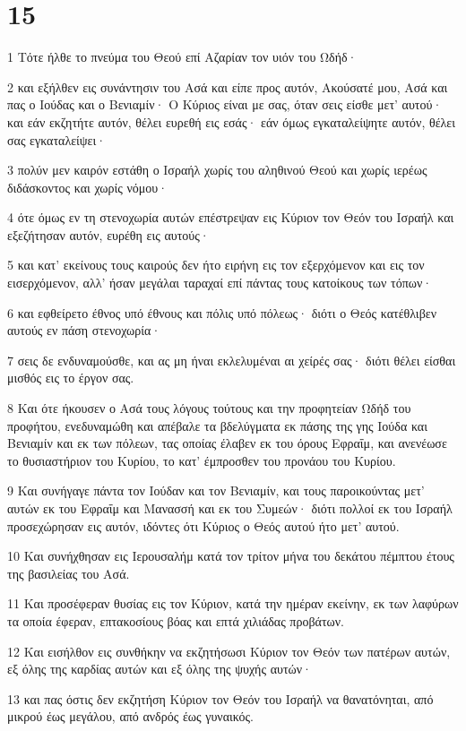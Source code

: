 \chapter{15}

\par 1 Τότε ήλθε το πνεύμα του Θεού επί Αζαρίαν τον υιόν του Ωδήδ·
\par 2 και εξήλθεν εις συνάντησιν του Ασά και είπε προς αυτόν, Ακούσατέ μου, Ασά και πας ο Ιούδας και ο Βενιαμίν· Ο Κύριος είναι με σας, όταν σεις είσθε μετ' αυτού· και εάν εκζητήτε αυτόν, θέλει ευρεθή εις εσάς· εάν όμως εγκαταλείψητε αυτόν, θέλει σας εγκαταλείψει·
\par 3 πολύν μεν καιρόν εστάθη ο Ισραήλ χωρίς του αληθινού Θεού και χωρίς ιερέως διδάσκοντος και χωρίς νόμου·
\par 4 ότε όμως εν τη στενοχωρία αυτών επέστρεψαν εις Κύριον τον Θεόν του Ισραήλ και εξεζήτησαν αυτόν, ευρέθη εις αυτούς·
\par 5 και κατ' εκείνους τους καιρούς δεν ήτο ειρήνη εις τον εξερχόμενον και εις τον εισερχόμενον, αλλ' ήσαν μεγάλαι ταραχαί επί πάντας τους κατοίκους των τόπων·
\par 6 και εφθείρετο έθνος υπό έθνους και πόλις υπό πόλεως· διότι ο Θεός κατέθλιβεν αυτούς εν πάση στενοχωρία·
\par 7 σεις δε ενδυναμούσθε, και ας μη ήναι εκλελυμέναι αι χείρές σας· διότι θέλει είσθαι μισθός εις το έργον σας.
\par 8 Και ότε ήκουσεν ο Ασά τους λόγους τούτους και την προφητείαν Ωδήδ του προφήτου, ενεδυναμώθη και απέβαλε τα βδελύγματα εκ πάσης της γης Ιούδα και Βενιαμίν και εκ των πόλεων, τας οποίας έλαβεν εκ του όρους Εφραΐμ, και ανενέωσε το θυσιαστήριον του Κυρίου, το κατ' έμπροσθεν του προνάου του Κυρίου.
\par 9 Και συνήγαγε πάντα τον Ιούδαν και τον Βενιαμίν, και τους παροικούντας μετ' αυτών εκ του Εφραΐμ και Μανασσή και εκ του Συμεών· διότι πολλοί εκ του Ισραήλ προσεχώρησαν εις αυτόν, ιδόντες ότι Κύριος ο Θεός αυτού ήτο μετ' αυτού.
\par 10 Και συνήχθησαν εις Ιερουσαλήμ κατά τον τρίτον μήνα του δεκάτου πέμπτου έτους της βασιλείας του Ασά.
\par 11 Και προσέφεραν θυσίας εις τον Κύριον, κατά την ημέραν εκείνην, εκ των λαφύρων τα οποία έφεραν, επτακοσίους βόας και επτά χιλιάδας προβάτων.
\par 12 Και εισήλθον εις συνθήκην να εκζητήσωσι Κύριον τον Θεόν των πατέρων αυτών, εξ όλης της καρδίας αυτών και εξ όλης της ψυχής αυτών·
\par 13 και πας όστις δεν εκζητήση Κύριον τον Θεόν του Ισραήλ να θανατόνηται, από μικρού έως μεγάλου, από ανδρός έως γυναικός.
